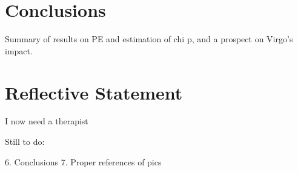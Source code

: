\documentclass[11pt]{article}
\begin{document}
\section{Conclusions}
Summary of results on PE and estimation of chi p, and a prospect on Virgo's impact.
\section{Reflective Statement}
I now need a therapist

Still to do:

6. Conclusions
7. Proper references of pics


\end{document}
